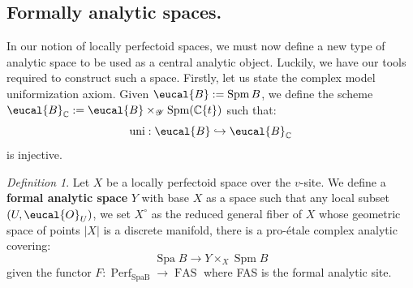 \documentclass[9pt]{amsart}
\renewcommand{\[}{\begin{equation}}
\renewcommand{\]}{\end{equation}}
\newcommand{\on}{\operatorname}
\theoremstyle{plain}
\theoremstyle{remark}
\newtheorem{defin}[thm]{Definition}
\begin{document}
\subsection{Formally analytic spaces.}
In our notion of locally perfectoid spaces, we must now define a new type of analytic space to be used as a central analytic object. Luckily, we have our tools required to construct such a space. Firstly, let us state the complex model uniformization axiom. Given $\eucal{B} := \on{Spm} B$, we define the scheme $\eucal{B}_{\mathbb{C}} := \eucal{B} \times_{\mathscr{Y}} \on{Spm}(\mathbb{C} \{ t \})$ such that: 
\[\on{uni}: \eucal{B} \hookrightarrow \eucal{B}_{\mathbb{C}}\]
is injective.
\begin{defin}
Let $X$ be a locally perfectoid space over the $v$-site. We define a \textbf{formal analytic space} $Y$ with base $X$ as a space such that any local subset $(U, \eucal{O}_U)$, we set $X^{\circ}$ as the reduced general fiber of $X$ whose geometric space of points $|X|$ is a discrete manifold, there is a pro-étale complex analytic covering:
$$\on{Spa} B \to Y \times_X \on{Spm} B$$
given the functor $F : \on{Perf}_{\on{Spa B}} \to \on{FAS}$ where FAS is the formal analytic site.
\end{defin}
\end{document}
